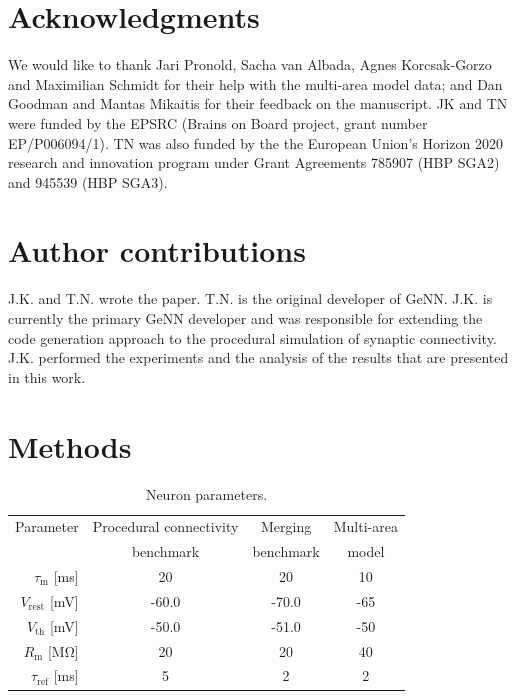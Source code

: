 \documentclass[9pt,a4paper]{amsart}
\begin{document}
\section{Acknowledgments}
We would like to thank Jari Pronold, Sacha van Albada, Agnes Korcsak-Gorzo and Maximilian Schmidt for their help with the multi-area model data; and Dan Goodman and Mantas Mikaitis for their feedback on the manuscript.
JK and TN were funded by the EPSRC (Brains on Board project, grant number EP/P006094/1).
TN was also funded by the the European Union’s Horizon 2020 research and innovation program under Grant Agreements 785907 (HBP SGA2) and 945539 (HBP SGA3).

\section{Author contributions}
J.K. and T.N. wrote the paper.
T.N. is the original developer of GeNN.
J.K. is currently the primary GeNN developer and was responsible for extending the code generation approach to the procedural simulation of synaptic connectivity.
J.K. performed the experiments and the analysis of the results that are presented in this work.

\section{Methods}
\begin{table}
  \centering
  \begin{tabular}{r S S S}
    \toprule
        {Parameter}                             & {Procedural connectivity} & {Merging}         & {Multi-area} \\
                                                & {benchmark}               & {benchmark}       & {model} \\
    \midrule
        $\tau_{\text{m}}$ [\si{\milli\second}]         & 20                        & 20                & 10 \\
        $V_{\text{rest}}$ [\si{\milli\volt}]           & -60.0                     & -70.0             & -65 \\
       
        $V_{\text{th}}$ [\si{\milli\volt}]         & -50.0                     & -51.0             & -50 \\
        $R_{\text{m}}$ [\si{\mega\ohm}]                  & 20                        & 20                & 40 \\
        $\tau_{\text{ref}}$ [\si{\milli\second}]       & 5                         & 2                 & 2 \\
    \bottomrule
  \end{tabular}
  \caption{Neuron parameters.}
  \label{tab:parameters}
\end{table}
\end{document}
